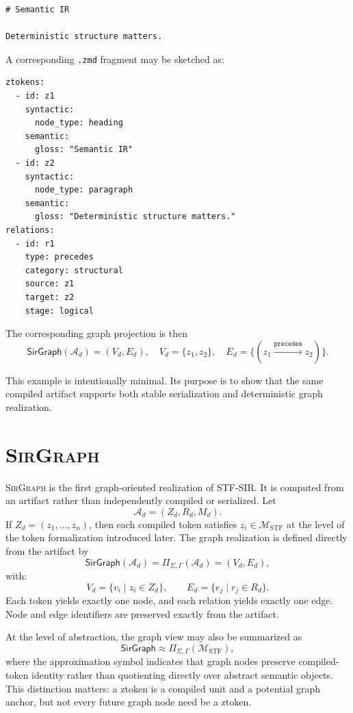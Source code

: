 \documentclass{article}
\newcommand{\STF}{{\normalfont\textsc{STF}}}
\newcommand{\SIR}{{\normalfont\textsc{SIR}}}
\newcommand{\SirGraphName}{{\normalfont\textsc{SirGraph}}}
\newcommand{\SirGraphOp}{\mathsf{SirGraph}}
\newcommand{\Manifold}{\mathcal{M}_{\mathrm{STF}}}
\begin{document}
\begin{verbatim}
# Semantic IR

Deterministic structure matters.
\end{verbatim}

A corresponding \texttt{.zmd} fragment may be sketched as:

\begin{verbatim}
ztokens:
  - id: z1
    syntactic:
      node_type: heading
    semantic:
      gloss: "Semantic IR"
  - id: z2
    syntactic:
      node_type: paragraph
    semantic:
      gloss: "Deterministic structure matters."
relations:
  - id: r1
    type: precedes
    category: structural
    source: z1
    target: z2
    stage: logical
\end{verbatim}

The corresponding graph projection is then
\[
\SirGraphOp(\mathcal{A}_d) = (V_d, E_d),
\quad
V_d = \{z_1, z_2\},
\quad
E_d = \{(z_1 \xrightarrow{\texttt{precedes}} z_2)\}.
\]

This example is intentionally minimal. Its purpose is to show that the same compiled artifact supports both stable serialization and deterministic graph realization.

\section{\SirGraphName{}}

\SirGraphName{} is the first graph-oriented realization of \STF{}-\SIR{}. It is computed from an artifact rather than independently compiled or serialized. Let
\[
\mathcal{A}_d = (Z_d, R_d, M_d).
\]
If \(Z_d = (z_1,\dots,z_n)\), then each compiled token satisfies \(z_i \in \Manifold\) at the level of the token formalization introduced later. The graph realization is defined directly from the artifact by
\[
\SirGraphOp(\mathcal{A}_d) = \Pi_{\Sigma,\Gamma}(\mathcal{A}_d) = (V_d, E_d),
\]
with:
\[
V_d = \{v_i \mid z_i \in Z_d\}, \qquad E_d = \{e_j \mid r_j \in R_d\}.
\]
Each token yields exactly one node, and each relation yields exactly one edge. Node and edge identifiers are preserved exactly from the artifact.

At the level of abstraction, the graph view may also be summarized as
\[
\mathsf{SirGraph} \approx \Pi_{\Sigma,\Gamma}(\Manifold),
\]
where the approximation symbol indicates that graph nodes preserve compiled-token identity rather than quotienting directly over abstract semantic objects. This distinction matters: a ztoken is a compiled unit and a potential graph anchor, but not every future graph node need be a ztoken.
\end{document}
